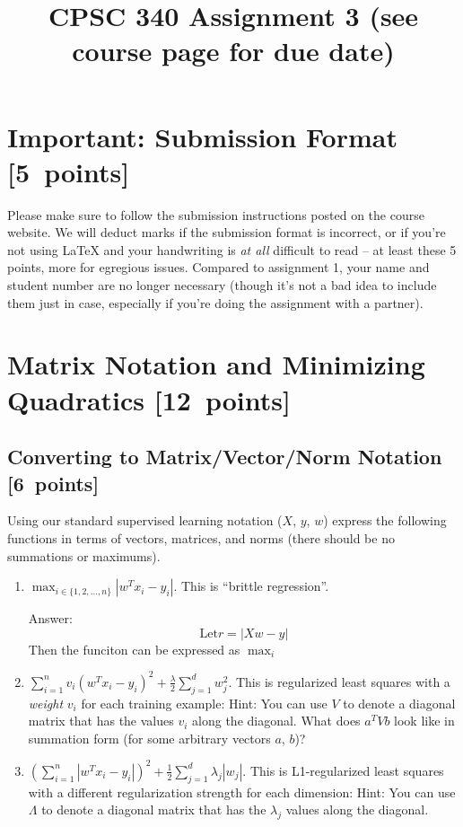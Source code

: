 \documentclass{article}
\newcommand{\blu}[1]{{\textcolor{blu}{#1}}}
\newenvironment{answer}{\par\begingroup\color{gre}Answer: }{\endgroup}
\let\ask\blu
\newcommand\pts[1]{\textcolor{pointscolour}{[#1~points]}}
\begin{document}
\title{CPSC 340 Assignment 3 (see course page for due date)}
\date{}
\maketitle


\vspace{-4em}



\section*{Important: Submission Format \pts{5}}

    Please make sure to follow the submission instructions posted on the course website.
    \ask{We will deduct marks if the submission format is incorrect, or if you're not using \LaTeX{} and your handwriting is \emph{at all} difficult to read} -- at least these 5 points, more for egregious issues.
    Compared to assignment 1, your name and student number are no longer necessary (though it's not a bad idea to include them just in case, especially if you're doing the assignment with a partner).


\section{Matrix Notation and Minimizing Quadratics \pts{12}}


\subsection{Converting to Matrix/Vector/Norm Notation \pts{6}}

Using our standard supervised learning notation ($X$, $y$, $w$)
\ask{express the following functions in terms of vectors, matrices, and norms} (there should be no summations or maximums).
\begin{enumerate}
\item $\max_{i \in \{1,2,\dots,n\}}  |w^Tx_i - y_i|$. This is ``brittle regression''.
\begin{answer}
	\begin{equation}
		\text{Let} r = | X w - y |
	\end{equation}
	Then the funciton can be expressed as $\max_i$
\end{answer}
\item $\sum_{i=1}^n v_i(w^Tx_i  - y_i)^2 + \frac{\lambda}{2}\sum_{j=1}^d w_j^2$. This is regularized least squares with a \emph{weight} $v_i$ for each training example:  Hint: You can use $V$ to denote a diagonal matrix that has the values $v_i$ along the diagonal. What does $a^T V b$ look like in summation form (for some arbitrary vectors $a$, $b$)?
%
\item $\left(\sum_{i=1}^n |w^Tx_i - y_i|\right)^2 +  \frac12 \sum_{j=1}^{d} \lambda_j|w_j|$. This is L1-regularized least squares with a different regularization strength for each dimension: Hint: You can use  $\Lambda$ to denote a diagonal matrix that has the $\lambda_j$ values along the diagonal.
%
\end{enumerate}
\end{document}
